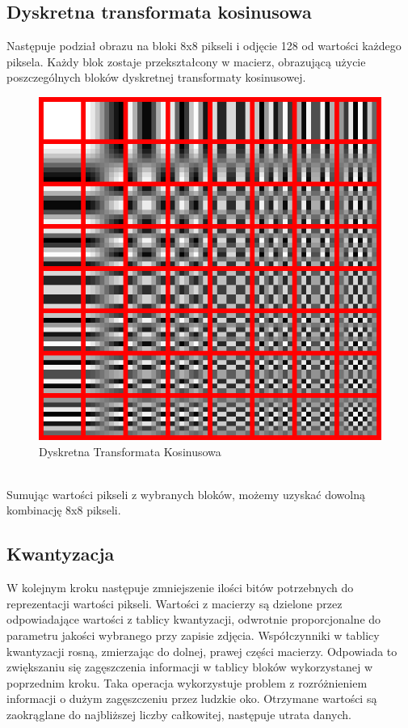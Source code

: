 \documentclass[a4paper, 12pt]{article}
\begin{document}
\subsection{Dyskretna transformata kosinusowa}
Następuje podział obrazu na bloki 8x8 pikseli i odjęcie 128 od wartości każdego piksela.
Każdy blok zostaje przekształcony w macierz, obrazującą użycie poszczególnych bloków dyskretnej transformaty kosinusowej.
\begin{figure}[h!]
	\begin{center}
	\includegraphics[width=0.4\columnwidth]{DCT.png}
	\caption{Dyskretna Transformata Kosinusowa}
\end{center}
\end{figure}
\\
Sumując wartości pikseli z wybranych bloków, możemy uzyskać dowolną kombinację 8x8 pikseli.
\subsection{Kwantyzacja}
W kolejnym kroku następuje zmniejszenie ilości bitów potrzebnych do reprezentacji wartości pikseli.
Wartości z macierzy są dzielone przez odpowiadające wartości z tablicy kwantyzacji, odwrotnie proporcjonalne do parametru jakości wybranego przy zapisie zdjęcia.
Współczynniki w tablicy kwantyzacji rosną, zmierzając do dolnej, prawej części macierzy.
Odpowiada to zwiększaniu się zagęszczenia informacji w tablicy bloków wykorzystanej w poprzednim kroku.
Taka operacja wykorzystuje problem z rozróżnieniem informacji o dużym zagęszczeniu przez ludzkie oko.
Otrzymane wartości są zaokrąglane do najbliższej liczby całkowitej, następuje utrata danych.
\end{document}
